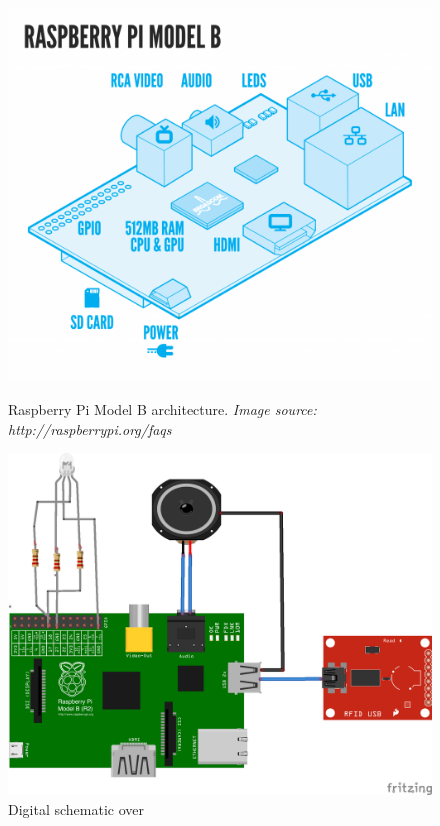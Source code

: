 \begin{figure}[H] 
	\begin{minipage}[b]{0.4\linewidth}
	\centering
		\includegraphics[width=0.3\paperwidth]{Pictures/rpi-arch-overview.png}
	\caption[Raspberry Pi Model B Architecture]{Raspberry Pi Model B architecture. \emph{Image source: http://raspberrypi.org/faqs} }
	\label{fig:pi-arch-overview}
	\end{minipage}
	\hspace{2.0cm}
	\begin{minipage}[b]{0.4\linewidth}
		\centering
			\includegraphics[width=0.3\paperwidth]{Pictures/pi-fritzing-model.png}
		\caption{Digital schematic over \rpi{} }
		\label{fig:pi-fritzing}
	\end{minipage}
\end{figure}
 
